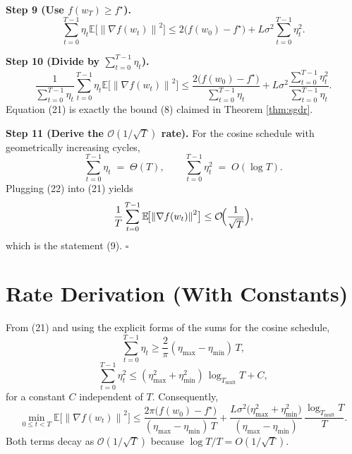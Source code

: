 \documentclass{article}
\newcommand{\E}{\mathbb{E}}
\newcommand{\norm}[1]{\left\lVert#1\right\rVert}
\begin{document}
\noindent\textbf{Step 9 (Use $f(w_{T})\ge f^{\star}$).}
\[
\sum_{t=0}^{T-1}\eta_{t}\E\!\bigl[\norm{\nabla f(w_{t})}^{2}\bigr]
\le 2\bigl(f(w_{0})-f^{\star}\bigr)
   +L\sigma^{2}\sum_{t=0}^{T-1}\eta_{t}^{2}.                         \tag{20}
\]

\noindent\textbf{Step 10 (Divide by $\sum_{t=0}^{T-1}\eta_{t}$).}
\[
\frac{1}{\sum_{t=0}^{T-1}\eta_{t}}
\sum_{t=0}^{T-1}\eta_{t}\E\!\bigl[\norm{\nabla f(w_{t})}^{2}\bigr]
\le
\frac{2\bigl(f(w_{0})-f^{\star}\bigr)}{\sum_{t=0}^{T-1}\eta_{t}}
   +L\sigma^{2}\frac{\sum_{t=0}^{T-1}\eta_{t}^{2}}{\sum_{t=0}^{T-1}\eta_{t}}.
\tag{21}
\]
Equation (21) is exactly the bound (8) claimed in Theorem \ref{thm:sgdr}.

\noindent\textbf{Step 11 (Derive the $\mathcal{O}(1/\sqrt{T})$ rate).}  
For the cosine schedule with geometrically increasing cycles,
\[
\sum_{t=0}^{T-1}\eta_{t}\;=\;\Theta(T),\qquad
\sum_{t=0}^{T-1}\eta_{t}^{2}\;=\;O(\log T).                         \tag{22}
\]
Plugging (22) into (21) yields
\[
\frac{1}{T}\sum_{t=0}^{T-1}\E\!\bigl[\norm{\nabla f(w_{t})}^{2}\bigr]
\le \mathcal{O}\!\Bigl(\frac{1}{\sqrt{T}}\Bigr),
\]
which is the statement (9). \hfill $\square$

\section*{Rate Derivation (With Constants)}
From (21) and using the explicit forms of the sums for the cosine schedule,
\[
\sum_{t=0}^{T-1}\eta_{t}
   \ge \frac{2}{\pi}(\eta_{\max}-\eta_{\min})\,T,                 \tag{23}
\]
\[
\sum_{t=0}^{T-1}\eta_{t}^{2}
   \le (\eta_{\max}^{2}+\eta_{\min}^{2})\,\log_{T_{\text{mult}}}T
      + C,                                                         \tag{24}
\]
for a constant $C$ independent of $T$.  
Consequently,
\[
\min_{0\le t<T}\E\!\bigl[\norm{\nabla f(w_{t})}^{2}\bigr]
\le
\frac{2\pi\bigl(f(w_{0})-f^{\star}\bigr)}{(\eta_{\max}-\eta_{\min})\,T}
   +\frac{L\sigma^{2}\bigl(\eta_{\max}^{2}+\eta_{\min}^{2}\bigr)}
          {(\eta_{\max}-\eta_{\min})}\,
          \frac{\log_{T_{\text{mult}}}T}{T}.                     \tag{25}
\]
Both terms decay as $\mathcal{O}(1/\sqrt{T})$ because $\log T/T = O(1/\sqrt{T})$.
\end{document}
